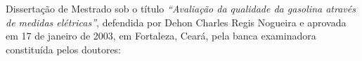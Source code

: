 
\begin{folhadeaprovacao}
Dissertação de Mestrado sob o título \textit{``Avaliação da qualidade da gasolina através de medidas elétricas''}, defendida por Dehon Charles Regis Nogueira e aprovada em 17 de janeiro de 2003, em Fortaleza, Ceará, pela banca examinadora constituída pelos doutores:

\setlength{\ABNTsignthickness}{0.4pt}
\setlength{\ABNTsignwidth}{10cm}
\setlength{\ABNTsignskip}{3.5cm}




\end{folhadeaprovacao}
